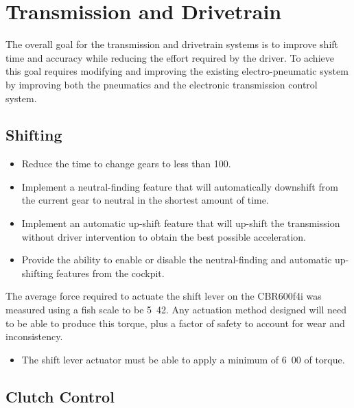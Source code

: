 \section{Transmission and Drivetrain\label{sec:goals_transmission}}

The overall goal for the transmission and drivetrain systems is to improve shift time and accuracy while reducing the effort required by the driver. To achieve this goal requires modifying and improving the existing electro-pneumatic system by improving both the pneumatics and the electronic transmission control system. 

\subsection{Shifting}

\begin{itemize}
\item Reduce the time to change gears to less than \unit{100}{\milli\second}. 
\item Implement a neutral-finding feature that will automatically downshift from the current gear to neutral in the shortest amount of time.
\item Implement an automatic up-shift feature that will up-shift the transmission without driver intervention to obtain the best possible acceleration.
\item Provide the ability to enable or disable the neutral-finding and automatic up-shifting features from the cockpit.
\end{itemize}

The average force required to actuate the shift lever on the CBR600f4i was measured using a fish scale to be \unit{5.42}{\newton\metre}. Any actuation method designed will need to be able to produce this torque, plus a factor of safety to account for wear and inconsistency.

\begin{itemize}
\item The shift lever actuator must be able to apply a minimum of \unit{6.00}{\newton\metre} of torque.
\end{itemize}

\subsection{Clutch Control}

